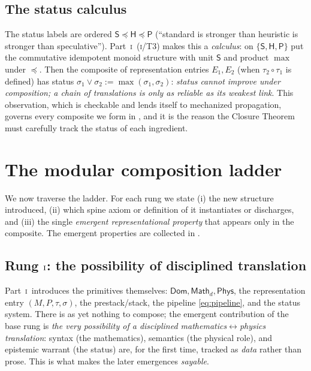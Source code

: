 \documentclass[12pt]{article}
\theoremstyle{definition}
\theoremstyle{remark}
\newcommand{\Dom}{\mathsf{Dom}}
\newcommand{\Math}{\mathsf{Math}}
\newcommand{\Phys}{\mathsf{Phys}}
\newcommand{\Sstat}{\textsf{S}}
\newcommand{\Hstat}{\textsf{H}}
\newcommand{\Pstat}{\textsf{P}}
\newcommand{\stle}{\preceq}
\newcommand{\PI}{\textsc{i}}
\begin{document}
\subsection{The status calculus}
\label{sec:statuscalc}

The status labels are ordered $\Sstat\stle\Hstat\stle\Pstat$ (``standard is stronger
than heuristic is stronger than speculative'').  Part~\PI\ (\PI/T3) makes this a
\emph{calculus}: on $\{\Sstat,\Hstat,\Pstat\}$ put the commutative idempotent monoid
structure with unit $\Sstat$ and product $\max$ under $\stle$.  Then the composite of
representation entries $E_1,E_2$ (when $\tau_2\circ\tau_1$ is defined) has status
$\sigma_1\vee\sigma_2:=\max(\sigma_1,\sigma_2)$: \emph{status cannot improve under
composition; a chain of translations is only as reliable as its weakest link}.  This
observation, which is checkable and lends itself to mechanized propagation, governs
every composite we form in , and it is the reason the
Closure Theorem must carefully track the status of each ingredient.

\section{The modular composition ladder}
\label{sec:ladder}

We now traverse the ladder.  For each rung we state (i) the new structure introduced,
(ii) which spine axiom or definition of  it instantiates or
discharges, and (iii) the single \emph{emergent representational property} that
appears only in the composite.  The
emergent properties are collected in .

\subsection{Rung \texorpdfstring{$\PI$}{I}: the possibility of disciplined translation}

Part~\PI\ introduces the primitives themselves: $\Dom,\Math_d,\Phys$, the
representation entry $(M,P,\tau,\sigma)$, the prestack/stack, the pipeline
\eqref{eq:pipeline}, and the status system.  There is as yet nothing to compose;
the emergent contribution of the base rung is \emph{the very possibility of a
disciplined mathematics$\leftrightarrow$physics translation}: syntax (the
mathematics), semantics (the physical role), and epistemic warrant (the status) are,
for the first time, tracked as \emph{data} rather than prose.  This is what makes the
later emergences \emph{sayable}.
\end{document}
